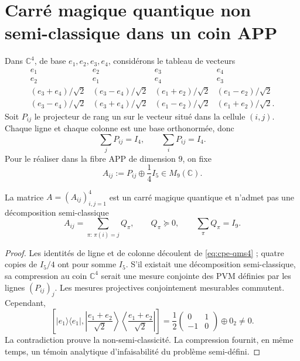 \section{Carré magique quantique non semi-classique dans un coin APP}
\label{sec:cpe-qms-no-semiclasico}

Dans \(\mathbb C^4\), de base \(e_1,e_2,e_3,e_4\), considérons le tableau de
vecteurs
\[
\begin{array}{cccc}
e_1&e_2&e_3&e_4\\
e_2&e_1&e_4&e_3\\
(e_3+e_4)/\sqrt2&(e_3-e_4)/\sqrt2&(e_1+e_2)/\sqrt2&(e_1-e_2)/\sqrt2\\
(e_3-e_4)/\sqrt2&(e_3+e_4)/\sqrt2&(e_1-e_2)/\sqrt2&(e_1+e_2)/\sqrt2.
\end{array}
\]
Soit \(P_{ij}\) le projecteur de rang un sur le vecteur situé dans la
cellule \((i,j)\). Chaque ligne et chaque colonne est une base orthonormée, donc
\begin{equation}
 \sum_jP_{ij}=I_4,
 \qquad \sum_iP_{ij}=I_4.
 \label{eq:cpe-qms4}
\end{equation}
Pour le réaliser dans la fibre APP de dimension \(9\), on fixe
\begin{equation}
 A_{ij}:=P_{ij}\oplus\frac14I_5\in M_9(\mathbb C).
 \label{eq:cpe-qms9}
\end{equation}

\begin{theorem}
\label{thm:cpe-qms-no-semiclasico}
La matrice \(A=(A_{ij})_{i,j=1}^4\) est un carré magique quantique et n'admet pas
une décomposition semi-classique
\[
 A_{ij}=\sum_{\pi:\,\pi(i)=j}Q_\pi,
 \qquad Q_\pi\succeq0,
 \qquad\sum_\pi Q_\pi=I_9.
\]
\end{theorem}

\begin{proof}
Les identités de ligne et de colonne découlent de
\eqref{eq:cpe-qms4} ; quatre copies de \(I_5/4\) ont pour somme \(I_5\). S'il existait
une décomposition semi-classique, sa compression au coin \(\mathbb C^4\)
serait une mesure conjointe des PVM définies par les lignes
\((P_{ij})_j\). Les mesures projectives conjointement mesurables commutent.
Cependant,
\[
 \left[
 |e_1\rangle\langle e_1|,
 \left|\frac{e_1+e_2}{\sqrt2}\right\rangle
 \left\langle\frac{e_1+e_2}{\sqrt2}\right|
 \right]
 =\frac12
 \begin{pmatrix}0&1\\-1&0\end{pmatrix}
 \oplus0_2\ne0.
\]
La contradiction prouve la non-semi-classicité. La compression fournit, en
même temps, un témoin analytique d'infaisabilité du problème semi-défini.
\end{proof}

